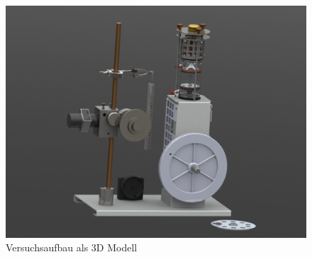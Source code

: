\documentclass[12pt,a4paper]{article}
\begin{document}
\begin{figure}[H]
	\centering

	\includegraphics[scale=0.45]{./data/3D-Model/PS9-model_neutral01.JPG}

	\caption{Versuchsaufbau als 3D Modell}
	\label{fig:stirlingMotor_3D}
\end{figure}
\end{document}

